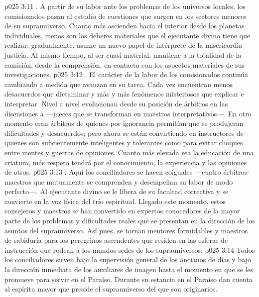 \vs p025 3:11 . A partir de su labor ante los problemas de los universos locales, los comisionados pasan al estudio de cuestiones que surgen en los sectores menores de su suprauniverso. Cuanto más ascienden hacia el interior desde los planetas individuales, menos son los deberes materiales que el ejecutante divino tiene que realizar; gradualmente, asume un nuevo papel de intérprete de la misericordia\hyp{}justicia. Al mismo tiempo, al ser cuasi material, mantiene a la totalidad de la comisión, desde la comprensión, en contacto con los aspectos materiales de sus investigaciones.
\vs p025 3:12 . El carácter de la labor de los comisionados continúa cambiando a medida que avanzan en su tarea. Cada vez encuentran menos desacuerdos que dictaminar y más y más fenómenos misteriosos que explicar e interpretar. Nivel a nivel evolucionan desde su posición de árbitros en las disensiones a  ---jueces que se transforman en maestros interpretativos---. En otro momento eran árbitros de quienes por ignorancia permitían que se produjeran dificultades y desacuerdos; pero ahora se están convirtiendo en instructores de quienes son suficientemente inteligentes y tolerantes como para evitar choques entre mentes y guerras de opiniones. Cuanto más elevada sea la educación de una criatura, más respeto tendrá por el conocimiento, la experiencia y las opiniones de otros.
\vs p025 3:13 . Aquí los conciliadores se hacen coiguales ---cuatro árbitros\hyp{}maestros que mutuamente se comprenden y desempeñan su labor de modo perfecto---. Al ejecutante divino se le libera de su facultad correctiva y se convierte en la voz física del trío espiritual. Llegado este momento, estos consejeros y maestros se han convertido en expertos conocedores de la mayor parte de los problemas y dificultades reales que se presentan en la dirección de los asuntos del suprauniverso. Así pues, se tornan mentores formidables y maestros de sabiduría para los peregrinos ascendentes que residen en las esferas de instrucción que rodean a los mundos sedes de los suprauniversos.
\vs p025 3:14 \pc Todos los conciliadores sirven bajo la supervisión general de los ancianos de días y bajo la dirección inmediata de los auxiliares de imagen hasta el momento en que se les promueve para servir en el Paraíso. Durante su estancia en el Paraíso dan cuenta al espíritu mayor que preside el suprauniverso del que son originarios.
